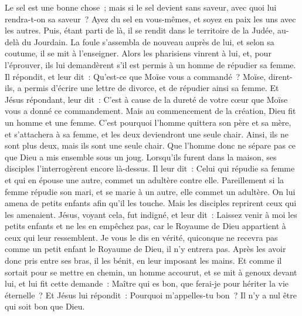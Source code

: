 \begin{multicols}{2}
Le sel est une bonne chose~; mais si le sel devient sans saveur, avec quoi lui rendra-t-on sa saveur~?
Ayez du sel en vous-mêmes, et soyez en paix les uns avec les autres.
\VerseOne{}Puis, étant parti de là, il se rendit dans le territoire de la Judée, au-delà du Jourdain. La foule s'assembla de nouveau auprès de lui, et selon sa coutume, il se mit à l'enseigner.
Alors les pharisiens vinrent à lui, et, pour l'éprouver, ils lui demandèrent s'il est permis à un homme de répudier sa femme.
Il répondit, et leur dit~: Qu'est-ce que Moïse vous a commandé~?
Moïse, dirent-ils, a permis d'écrire une lettre de divorce, et de répudier ainsi sa femme.
Et Jésus répondant, leur dit~: C'est à cause de la dureté de votre cœur que Moïse vous a donné ce commandement.
Mais au commencement de la création, Dieu fit un homme et une femme.
C'est pourquoi l'homme quittera son père et sa mère, et s'attachera à sa femme,
et les deux deviendront une seule chair. Ainsi, ils ne sont plus deux, mais ils sont une seule chair.
Que l'homme donc ne sépare pas ce que Dieu a mis ensemble sous un joug.
Lorsqu'ils furent dans la maison, ses disciples l'interrogèrent encore là-dessus.
Il leur dit~: Celui qui répudie sa femme et qui en épouse une autre, commet un adultère contre elle.
Pareillement si la femme répudie son mari, et se marie à un autre, elle commet un adultère.
On lui amena de petits enfants afin qu'il les touche. Mais les disciples reprirent ceux qui les amenaient.
Jésus, voyant cela, fut indigné, et leur dit~: Laissez venir à moi les petits enfants et ne les en empêchez pas, car le Royaume de Dieu appartient à ceux qui leur ressemblent.
Je vous le dis en vérité, quiconque ne recevra pas comme un petit enfant le Royaume de Dieu, il n'y entrera pas.
Après les avoir donc pris entre ses bras, il les bénit, en leur imposant les mains.
Et comme il sortait pour se mettre en chemin, un homme accourut, et se mit à genoux devant lui, et lui fit cette demande~: Maître qui es bon, que ferai-je pour hériter la vie éternelle~?
Et Jésus lui répondit~: Pourquoi m'appelles-tu bon~? Il n'y a nul être qui soit bon que Dieu.

\end{multicols}
